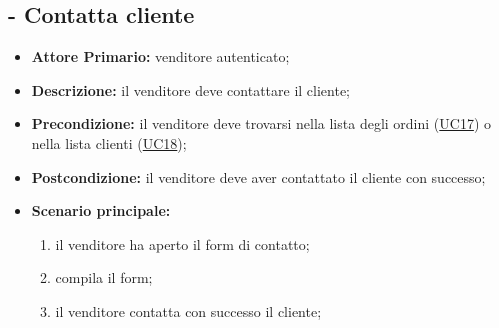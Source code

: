 \stepUserCase
\subsection{ - Contatta cliente}
\begin{itemize}
    \item \textbf{Attore Primario:} venditore autenticato;
    \item \textbf{Descrizione:} il venditore deve contattare il cliente;
    \item \textbf{Precondizione:} il venditore deve trovarsi nella lista degli ordini (\hyperref[UC17]{UC17}) o nella lista clienti (\hyperref[UC18]{UC18});
    \item \textbf{Postcondizione:} il venditore deve aver contattato il cliente con successo;
    \item \textbf{Scenario principale:}
          \begin{enumerate}
              \item il venditore ha aperto il form di contatto;
              \item compila il form;
              \item il venditore contatta con successo il cliente;
          \end{enumerate}
\end{itemize}

\stepUserCase
